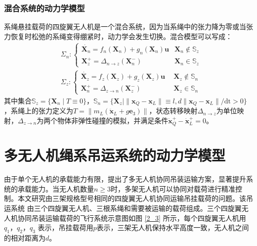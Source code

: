 \documentclass[lang=chs, degree=master, blindreview=true, winfonts=true]{yanputhesis}
\begin{document}
\subsubsection{混合系统的动力学模型}
系绳悬挂载荷的四旋翼无人机是一个混合系统，因为当系绳中的张力降为零或当张力恢复时松弛的系绳变得绷紧时，动力学会发生切换。混合模型可以写成：
\begin{equation}
	\left.\begin{aligned}&\Sigma_{n}:\left\{\begin{array}{ll}\dot{\bm X_n}= f_n(\bm X_n)+ g_n(\bm X_n)\bm u  &\bm X_n\notin \mathbb{S}_z\\\bm X_z^+=\Delta_{n\to z}(\bm X_n^-)  &\bm X_n\in \mathbb{S}_z\end{array}\right.\\&\Sigma_{z}:\left\{\begin{array}{ll}\dot{\bm X_z}=f_z(\bm X_z) + g_z(\bm X_z)\bm u \ \ &\bm X_z\notin \mathbb{S}_n\\\bm X_n^+=\Delta_{z\to n}(\bm X_z^-) \ &\bm X_z\in \mathbb{S}_n\end{array}\right.\end{aligned}\right.
	\label{eq:混合模型}
\end{equation}
其中集合$\mathbb S_z = \{ \bm X_n \mid  T \equiv 0 \}$，$\mathbb S_n = \{ \bm X_z \mid \|\bm x_Q - \bm x_L\| \equiv l, d \|\bm x_Q - \bm x_L\| /\text{dt}> 0 \}$，系绳上的张力定义为$ T = \|m_L (\ddot{\bm x}_L + g\bm{e}_3)\|$，状态转移映射$\Delta_{n\to z}$为单位映射，$\Delta_{z\to n}$为两个物体非弹性碰撞的模拟，并满足条件$\dot{\bm x}_Q^+-\dot{\bm x}_L^+=0$。

\section{多无人机绳系吊运系统的动力学模型}
由于单个无人机的承载能力有限，提出了多无人机协同吊装运输方案，显著提升系统的承载能力。当无人机数量$n\geq3$时，多架无人机可以协同对载荷进行精准控制\cite{fink2011planning}。本文研究由三架规格型号相同的四旋翼无人机协同运输吊挂载荷的问题。该吊运系统
由三个四旋翼无人机、三根系绳和需要被运输的载荷组成。三个四旋翼无人机协同吊装运输载荷的飞行系统示意图如图 \ref{2_3} 所示，每个四旋翼无人机用
$q_1$，$q_2$，$q_3$ 表示，吊挂载荷用$p$表示，三架无人机保持水平高度一致，无人机之间的相对距离为$d$。
\end{document}
